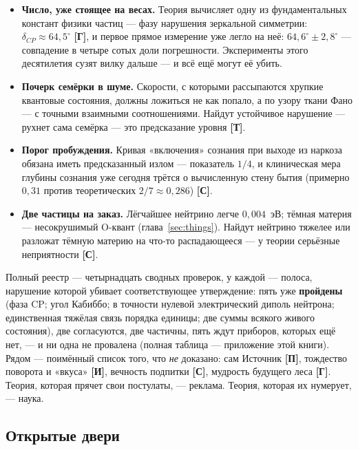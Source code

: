 \documentclass[11pt,letterpaper]{article}
\newcommand{\stT}{\textbf{[Т]}\xspace}
\newcommand{\stC}{\textbf{[С]}\xspace}
\newcommand{\stP}{\textbf{[П]}\xspace}
\newcommand{\stI}{\textbf{[И]}\xspace}
\newcommand{\stH}{\textbf{[Г]}\xspace}
\begin{document}
\begin{itemize}[leftmargin=1.6em]
  \item \textbf{Число, уже стоящее на весах.} Теория вычисляет одну
        из фундаментальных констант физики частиц --- фазу нарушения
        зеркальной симметрии: $\delta_{CP}\approx 64{,}5^\circ$
        \stH{}, и первое прямое измерение уже легло на неё:
        $64{,}6^\circ\pm2{,}8^\circ$ --- совпадение в четыре сотых
        доли погрешности. Эксперименты этого десятилетия сузят
        вилку дальше --- и всё ещё могут её убить.
  \item \textbf{Почерк семёрки в шуме.} Скорости, с которыми
        рассыпаются хрупкие квантовые состояния, должны ложиться не
        как попало, а по узору ткани Фано --- с точными взаимными
        соотношениями. Найдут устойчивое нарушение --- рухнет сама
        семёрка --- это предсказание уровня \stT.
  \item \textbf{Порог пробуждения.} Кривая «включения» сознания при
        выходе из наркоза обязана иметь предсказанный излом ---
        показатель $1/4$, и клиническая мера глубины сознания уже
        сегодня трётся о вычисленную стену бытия (примерно $0{,}31$
        против теоретических $2/7\approx0{,}286$) \stC.
  \item \textbf{Две частицы на заказ.} Лёгчайшее нейтрино легче
        $0{,}004$~эВ; тёмная материя --- несокрушимый O-квант
        (глава~\ref{sec:things}). Найдут нейтрино тяжелее или
        разложат тёмную материю на что-то распадающееся --- у
        теории серьёзные неприятности \stC.
\end{itemize}

\begin{factbox}
Полный реестр --- четырнадцать сводных проверок, у каждой --- полоса,
нарушение которой убивает соответствующее утверждение: пять уже
\textbf{пройдены} (фаза CP; угол Кабиббо; в точности нулевой
электрический диполь нейтрона; единственная тяжёлая связь порядка
единицы; две суммы всякого живого состояния), две согласуются, две
частичны, пять ждут приборов, которых ещё нет, --- и ни одна не
провалена (полная таблица --- приложение этой книги). Рядом ---
поимённый список того, что \emph{не} доказано: сам Источник \stP,
тождество поворота и «вкуса» \stI, вечность подпитки \stC, мудрость
будущего леса \stH. Теория, которая прячет свои постулаты, ---
реклама. Теория, которая их нумерует, --- наука.
\end{factbox}

\subsection*{Открытые двери}
\end{document}
